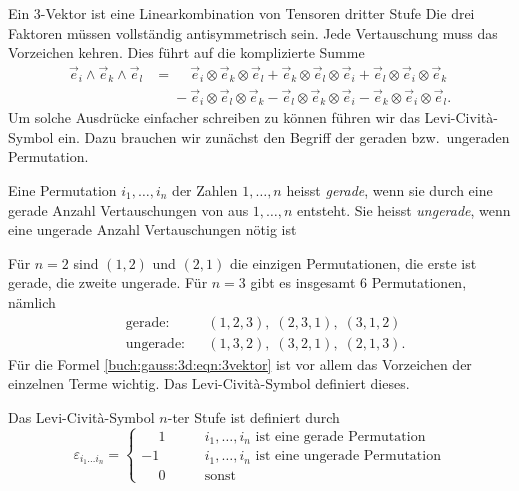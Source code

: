 Ein 3-Vektor ist eine Linearkombination von Tensoren dritter Stufe
Die drei Faktoren müssen vollständig antisymmetrisch sein.
Jede Vertauschung muss das Vorzeichen kehren.
Dies führt auf die komplizierte Summe
\begin{align}
\vec{e}_i
\wedge
\vec{e}_k
\wedge
\vec{e}_l
&=
\phantom{+}
\vec{e}_i\otimes\vec{e}_k\otimes\vec{e}_l
+
\vec{e}_k\otimes\vec{e}_l\otimes\vec{e}_i
+
\vec{e}_l\otimes\vec{e}_i\otimes\vec{e}_k
\\
&\phantom{=}
-
\vec{e}_i\otimes\vec{e}_l\otimes\vec{e}_k
-
\vec{e}_l\otimes\vec{e}_k\otimes\vec{e}_i
-
\vec{e}_k\otimes\vec{e}_i\otimes\vec{e}_l.
\label{buch:gauss:3d:eqn:3vektor}
\end{align}
Um solche Ausdrücke einfacher schreiben zu können führen wir das
Levi-Cività-Symbol ein.
Dazu brauchen wir zunächst den Begriff der geraden bzw.~ungeraden
Permutation.

\begin{definition}
Eine Permutation $i_1,\dots,i_n$ der Zahlen $1,\dots,n$ heisst {\em gerade},
wenn sie durch eine gerade Anzahl Vertauschungen von aus $1,\dots,n$
entsteht.
Sie heisst {\em ungerade}, wenn eine ungerade Anzahl Vertauschungen
nötig ist
%
%
\end{definition}

Für $n=2$ sind $(1,2)$ und $(2,1)$ die einzigen Permutationen,
die erste ist gerade, die zweite ungerade.
Für $n=3$ gibt es insgesamt 6 Permutationen, nämlich
\[
\begin{aligned}
&\text{gerade:}  &&(1,2,3),\;(2,3,1),\;(3,1,2)\\
&\text{ungerade:}&&(1,3,2),\;(3,2,1),\;(2,1,3).
\end{aligned}
\]
Für die Formel \eqref{buch:gauss:3d:eqn:3vektor} ist vor allem
das Vorzeichen der einzelnen Terme wichtig.
Das Levi-Cività-Symbol definiert dieses.

\begin{definition}
Das Levi-Cività-Symbol $n$-ter Stufe ist definiert durch
\[
\varepsilon_{i_1\dots i_n}
=
\begin{cases}
\phantom{-}1&\qquad\text{$i_1,\dots,i_n$ ist eine gerade Permutation}\\
         - 1&\qquad\text{$i_1,\dots,i_n$ ist eine ungerade Permutation}\\
\phantom{-}0&\qquad\text{sonst}
\end{cases}
\]
\end{definition}

